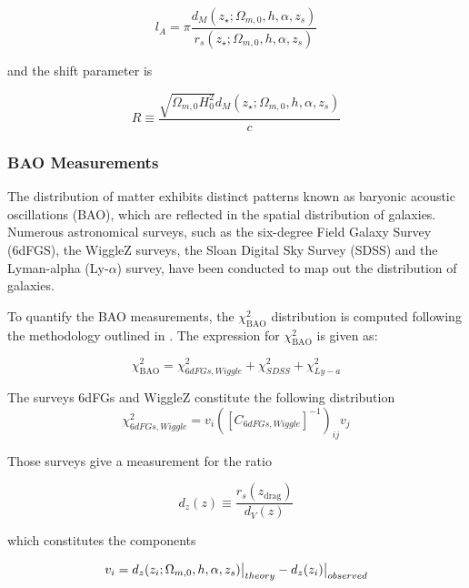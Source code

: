 \documentclass[universe,article,accept,moreauthors,pdftex]{Definitions/mdpi}
\begin{document}
\begin{equation}
l_{A}=\pi\frac{d_{M}(z_{\star};\Omega_{m,0},h,\alpha,z_{s})}{r_{s}(z_{\star};\Omega_{m,0},h,\alpha,z_{s})}
\end{equation}

and the shift parameter is

\begin{equation}
R\equiv\frac{\sqrt{\Omega_{m,0}H_{0}^{2}}d_{M}(z_{\star};\Omega_{m,0},h,\alpha,z_{s})}{c}
\end{equation}


\subsubsection{BAO Measurements}

The distribution of matter exhibits distinct patterns known as baryonic acoustic oscillations (BAO), which are reflected in the spatial distribution of galaxies. Numerous astronomical surveys, such as the six-degree Field Galaxy Survey (6dFGS), the WiggleZ surveys, the Sloan Digital Sky Survey (SDSS) and the Lyman-alpha (Ly-$\alpha$) survey, have been conducted to map out the distribution of galaxies.

To quantify the BAO measurements, the $\chi^{2}_{\text{BAO}}$ distribution is computed following the methodology outlined in \cite{Theodoropoulos:2021hkk,Escamilla_Rivera_2016}. The expression for $\chi^{2}_{\text{BAO}}$ is given as:

\begin{equation}\label{chibao}
\chi^{2}_{\text{BAO}}=\chi^{2}_{6dFGs,Wiggle}+\chi^{2}_{SDSS}+\chi^{2}_{Ly-a}
\end{equation}


 
The surveys 6dFGs \cite{article003} and WiggleZ  \cite{Drinkwater:2009sd}  constitute the following distribution \begin{equation}\chi^{2}_{6dFGs,Wiggle}=v_{i}([C_{6dFGs,Wiggle}]^{-1})_{ij}v_{j}\end{equation}

Those surveys give a measurement for the ratio

\begin{equation}
    d_{z}(z)\equiv\frac{r_{s}(z_{\text{drag}})}{d_{V}(z)}
\end{equation}

which constitutes the components 

\begin{equation}v_{i}=d_{z}(z_{i};\Omega_{m,0},h,\alpha,z_{s})\big{|}_{theory}-d_{z}(z_{i})\big{|}_{observed}\end{equation}
\end{document}
